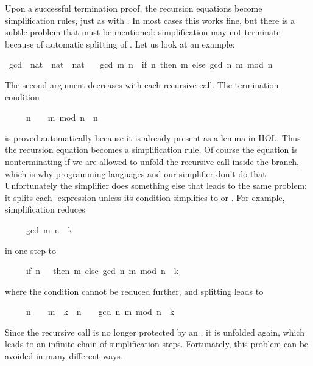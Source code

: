 \begin{isabellebody}
\begin{isamarkuptext}
Upon a successful termination proof, the recursion equations become
simplification rules, just as with .
In most cases this works fine, but there is a subtle
problem that must be mentioned: simplification may not
terminate because of automatic splitting of .
Let us look at an example:%
\end{isamarkuptext}%
\isamarkuptrue%
\isamarkupfalse%
\ gcd\ {\isacharcolon}{\isacharcolon}\ {\isachardoublequoteopen}nat\ {\isasymRightarrow}\ nat\ {\isasymRightarrow}\ nat{\isachardoublequoteclose}\ \isanewline
\ \ {\isachardoublequoteopen}gcd\ m\ n\ {\isacharequal}\ {\isacharparenleft}if\ n{\isacharequal}{}\ then\ m\ else\ gcd\ n\ {\isacharparenleft}m\ mod\ n{\isacharparenright}{\isacharparenright}{\isachardoublequoteclose}%
\begin{isamarkuptext}%
\noindent
The second argument decreases with each recursive call.
The termination condition
\begin{isabelle}%
\ \ \ \ \ n\ {\isasymnoteq}\ {}\ {\isasymLongrightarrow}\ m\ mod\ n\ {\isacharless}\ n%
\end{isabelle}
is proved automatically because it is already present as a lemma in
HOL\@.  Thus the recursion equation becomes a simplification
rule. Of course the equation is nonterminating if we are allowed to unfold
the recursive call inside the  branch, which is why programming
languages and our simplifier don't do that. Unfortunately the simplifier does
something else that leads to the same problem: it splits 
each -expression unless its
condition simplifies to  or .  For
example, simplification reduces
\begin{isabelle}%
\ \ \ \ \ gcd\ m\ n\ {\isacharequal}\ k%
\end{isabelle}
in one step to
\begin{isabelle}%
\ \ \ \ \ {\isacharparenleft}if\ n\ {\isacharequal}\ {}\ then\ m\ else\ gcd\ n\ {\isacharparenleft}m\ mod\ n{\isacharparenright}{\isacharparenright}\ {\isacharequal}\ k%
\end{isabelle}
where the condition cannot be reduced further, and splitting leads to
\begin{isabelle}%
\ \ \ \ \ {\isacharparenleft}n\ {\isacharequal}\ {}\ {\isasymlongrightarrow}\ m\ {\isacharequal}\ k{\isacharparenright}\ {\isasymand}\ {\isacharparenleft}n\ {\isasymnoteq}\ {}\ {\isasymlongrightarrow}\ gcd\ n\ {\isacharparenleft}m\ mod\ n{\isacharparenright}\ {\isacharequal}\ k{\isacharparenright}%
\end{isabelle}
Since the recursive call  is no longer protected by
an , it is unfolded again, which leads to an infinite chain of
simplification steps. Fortunately, this problem can be avoided in many
different ways.


\end{isamarkuptext}
\end{isabellebody}

